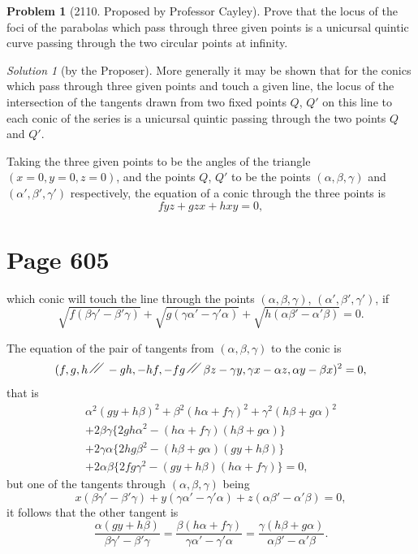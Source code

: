 \documentclass[12pt,a4paper]{article}
\theoremstyle{plain}
\theoremstyle{definition}
\newtheorem{problem}{Problem}
\theoremstyle{remark}
\newtheorem*{solution}{Solution}
\begin{document}
\begin{problem}[2110. Proposed by Professor Cayley]
Prove that the locus of the foci of the parabolas which pass through three given points is a unicursal quintic curve passing through the two circular points at infinity.
\end{problem}

\begin{solution}[by the Proposer]
More generally it may be shown that for the conics which pass through three given points and touch a given line, the locus of the intersection of the tangents drawn from two fixed points $Q$, $Q'$ on this line to each conic of the series is a unicursal quintic passing through the two points $Q$ and $Q'$.

Taking the three given points to be the angles of the triangle $(x = 0, y = 0, z = 0)$, and the points $Q$, $Q'$ to be the points $(\alpha, \beta, \gamma)$ and $(\alpha', \beta', \gamma')$ respectively, the equation of a conic through the three points is
\[
fyz + gzx + hxy = 0,
\]

\section*{Page 605}
\setcounter{page}{605}

which conic will touch the line through the points $(\alpha, \beta, \gamma)$, $(\alpha', \beta', \gamma')$, if
\[
\sqrt{f(\beta\gamma' - \beta'\gamma)} + \sqrt{g(\gamma\alpha' - \gamma'\alpha)} + \sqrt{h(\alpha\beta' - \alpha'\beta)} = 0.
\]

The equation of the pair of tangents from $(\alpha, \beta, \gamma)$ to the conic is
\[
(f, g, h \,\raisebox{0.5ex}{\ensuremath{\diagup\kern-0.5em\diagup}}\, -gh, -hf, -fg \,\raisebox{0.5ex}{\ensuremath{\diagup\kern-0.5em\diagup}}\, \beta z - \gamma y, \gamma x - \alpha z, \alpha y - \beta x)^2 = 0,
\]
that is
\begin{multline*}
\alpha^2(gy + h\beta)^2 + \beta^2(h\alpha + f\gamma)^2 + \gamma^2(h\beta + g\alpha)^2 \\
+ 2\beta\gamma\{2gh\alpha^2 - (h\alpha + f\gamma)(h\beta + g\alpha)\} \\
+ 2\gamma\alpha\{2hg\beta^2 - (h\beta + g\alpha)(gy + h\beta)\} \\
+ 2\alpha\beta\{2fg\gamma^2 - (gy + h\beta)(h\alpha + f\gamma)\} = 0,
\end{multline*}
but one of the tangents through $(\alpha, \beta, \gamma)$ being
\[
x(\beta\gamma' - \beta'\gamma) + y(\gamma\alpha' - \gamma'\alpha) + z(\alpha\beta' - \alpha'\beta) = 0,
\]
it follows that the other tangent is
\[
\frac{\alpha(gy + h\beta)}{\beta\gamma' - \beta'\gamma} =
\frac{\beta(h\alpha + f\gamma)}{\gamma\alpha' - \gamma'\alpha} =
\frac{\gamma(h\beta + g\alpha)}{\alpha\beta' - \alpha'\beta}.
\]


\end{solution}
\end{document}

